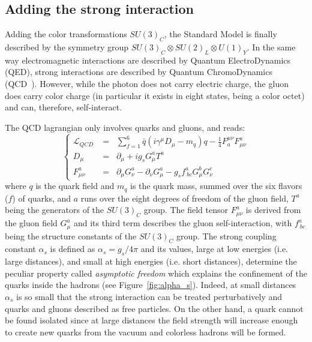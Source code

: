\begin{table}[htb]\centering

\end{table}


\subsection{Adding the strong interaction}\label{sec:qcdlagr}

Adding the color transformations $SU(3)_{C}$, the Standard Model is
finally described by the symmetry group 
$SU(3)_{C}\otimes SU(2)_{L}\otimes U(1)_{Y}$.
In the same way electromagnetic interactions are 
described by Quantum ElectroDynamics (QED), 
strong interactions are described by Quantum ChromoDynamics (QCD~\cite{Ecker}).
However, while the photon does not carry electric charge,
the gluon does carry color charge (in particular it exists in
eight states, being a color octet) and can, therefore, self-interact.

The QCD lagrangian only involves quarks and gluons, and reads:
\begin{equation}
\left \{ \begin{array}{cl}
\mathcal{L}_{QCD} &=\;\; \sum\limits_{f=1}^{6}\bar{q}(i\gamma^\mu D_\mu - m_q)q 
                    -\frac{1}{4}F^{\mu\nu}_{a}F^{a}_{\mu\nu}\\
 D_\mu &=\;\; \partial_\mu + ig_sG_\mu^a T^a\\
  F^{a}_{\mu\nu} &=\;\;  \partial_\mu G_\nu^a - \partial_\nu G_\mu^a - 
                    g_sf^{a}_{\ bc}G^b_\mu G^c_\nu
\end{array} \right.
\end{equation}
where $q$ is the quark field and $m_q$ is the quark mass, summed over 
the six flavors ($f$) of quarks, and $a$ runs over the eight degrees of 
freedom of the gluon field, $T^a$ being the generators
of the $SU(3)_C$ group. The field tensor $F^{a}_{\mu\nu}$ 
is derived from the gluon field $G_\mu^a$ and 
its third term describes the gluon self-interaction, with
$f^a_{\ bc}$ being the structure constants
of the $SU(3)_{C}$ group. 
The strong coupling constant $\alpha_s$ is defined
as  $\alpha_s=g_s/4\pi$ and its values, large at
low energies (i.e. large distances), and small at high 
energies (i.e. short distances), determine the 
peculiar property called {\it asymptotic freedom} which
explains the confinement of the quarks inside the hadrons
(see Figure~\ref{fig:alpha_s}). Indeed, at
small distances $\alpha_s$ is so small that
the strong interaction can be treated perturbatively
and quarks and gluons described as free particles.
On the other hand, a quark cannot be found
isolated since at large distances the field strength
will increase enough to create new quarks 
from the vacuum and colorless hadrons will be formed.

